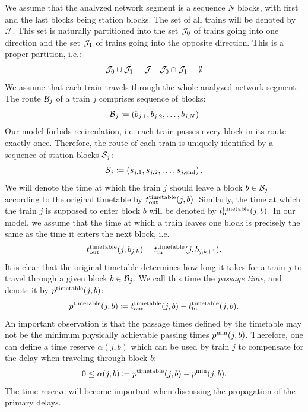 We assume that the analyzed network segment is a sequence $N$ blocks, with
first and the last blocks being station blocks. The set of all trains will be
denoted by $\mathcal{J}$. This set is naturally partitioned into the set $\mathcal{J}_0$ of
trains going into one direction and the set $\mathcal{J}_1$ of trains going into the
opposite direction. This is a proper partition, i.e.:
\begin{equation}
  \mathcal{J}_0 \cup \mathcal{J}_1 = \mathcal{J} \quad \mathcal{J}_0 \cap \mathcal{J}_1 = \emptyset
\end{equation}
We assume that each train travels through the whole analyzed network segment.
The route $\mathcal{B}_j$ of a train $j$ comprises sequence of blocks:
\begin{equation}
  \mathcal{B}_j \coloneq (b_{j,1}, b_{j,2}, \ldots, b_{j,N})
\end{equation}
Our model forbids recirculation, i.e. each train passes every block in its
route exactly once. Therefore, the route of each train is uniquely identified
by a sequence of station blocks $\mathcal{S}_j$:
\begin{equation}
  \mathcal{S}_j \coloneq  \left(s_{j,1}, s_{j, 2}, \ldots, s_{j, \operatorname*{end}}\right).
\end{equation}
We will denote the time at which the train $j$ should leave a block $b \in \mathcal{B}_j$ according to the
original timetable by $t_\text{out}^\text{timetable}(j, b)$. Similarly, the time at which the train
$j$ is supposed to enter block $b$ will be denoted by $t_\text{in}^\text{timetable}(j, b)$. In our
model, we assume that the time at which a train leaves one block is precisely
the same as the time it enters the next block, i.e.
\begin{equation}
  t_\text{out}^\text{timetable}(j, b_{j,k}) = t_\text{in}^\text{timetable}(j, b_{j,k+1}).
\end{equation}
It is clear that the original timetable determines how long it takes for a
train $j$ to travel through a given block $b \in \mathcal{B}_j$. We call this time the
\emph{passage time}, and denote it by $p^\text{timetable}(j, b)$:
\begin{equation}
  p^\text{timetable}(j, b) \coloneq t_\text{out}^\text{timetable}(j, b) - t_\text{in}^\text{timetable}(j, b).
\end{equation}
An important observation is that the passage times defined by the timetable may
not be the minimum physically achievable passing times $p^\text{min}(j, b)$.
Therefore, one can define a time reserve $\alpha(j, b)$ which can be used by
train $j$ to compensate for the delay when traveling through block $b$:
\begin{equation}
  \label{eq:pt}
  0 \le \alpha(j, b) \coloneq p^\text{timetable}(j, b) - p^\text{min}(j, b).
\end{equation}
The time reserve will become important when discussing the propagation of the
primary delays.

